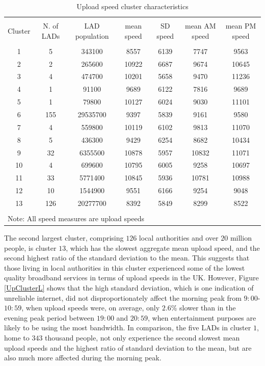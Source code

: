 \documentclass[]{interact}
\theoremstyle{plain}%
\theoremstyle{definition}
\theoremstyle{remark}
\begin{document}
\begin{table}[!htbp] \centering 
  \caption{Upload speed cluster characteristics\label{up.cluster.descr}} 
  \label{} 
\footnotesize 
\begin{tabular}{@{\extracolsep{0pt}} ccccccc} 
\\[-1.8ex]\hline 
\hline \\[-1.8ex] 
Cluster & N. of LADs & LAD population & mean speed & SD speed & mean AM speed & mean PM speed \\ 
\hline \\[-1.8ex] 
1 & 5 & 343100 & 8557 & 6139 & 7747 & 9563 \\ 
2 & 2 & 265600 & 10922 & 6687 & 9674 & 10645 \\ 
3 & 4 & 474700 & 10201 & 5658 & 9470 & 11236 \\ 
4 & 1 & 91100 & 9689 & 6122 & 7816 & 9689 \\ 
5 & 1 & 79800 & 10127 & 6024 & 9030 & 11101 \\ 
6 & 155 & 29535700 & 9397 & 5839 & 9161 & 9580 \\ 
7 & 4 & 559800 & 10119 & 6102 & 9813 & 11070 \\ 
8 & 5 & 436300 & 9429 & 6254 & 8682 & 10434 \\ 
9 & 32 & 6355500 & 10878 & 5957 & 10832 & 11071 \\ 
10 & 4 & 699600 & 10795 & 6005 & 9258 & 10697 \\ 
11 & 33 & 5771400 & 10845 & 5936 & 10781 & 10988 \\ 
12 & 10 & 1544900 & 9551 & 6166 & 9254 & 9048 \\ 
13 & 126 & 20277700 & 8392 & 5849 & 8299 & 8522 \\ 
\hline \\[-1.8ex] 
\multicolumn{7}{l}{Note: All speed measures are upload speeds} \\ 
\end{tabular} 
\end{table}

The second largest cluster, comprising \(126\) local authorities and
over \(20\) million people, is cluster \(13\), which has the slowest
aggregate mean upload speed, and the second highest ratio of the
standard deviation to the mean. This suggests that those living in local
authorities in this cluster experienced some of the lowest quality
broadband services in terms of upload speeds in the UK. However, Figure
\ref{UpClusterL} shows that the high standard deviation, which is one
indication of unreliable internet, did not disproportionately affect the
morning peak from \(9:00\)-\(10:59\), when upload speeds were, on
average, only \(2.6\)\% slower than in the evening peak period between
\(19:00\) and \(20:59\), when entertainment purposes are likely to be
using the most bandwidth. In comparison, the five LADs in cluster \(1\),
home to \(343\) thousand people, not only experience the second slowest
mean upload speeds and the highest ratio of standard deviation to the
mean, but are also much more affected during the morning peak.
\end{document}
